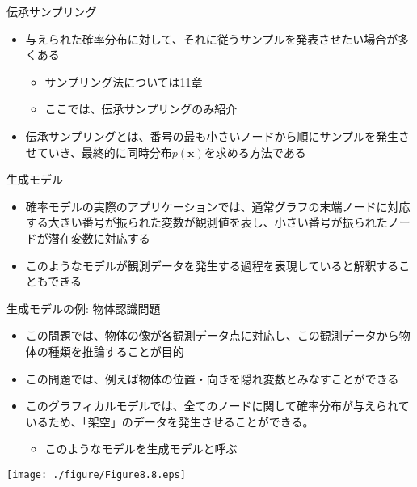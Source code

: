 \begin{frame}{伝承サンプリング}
 \begin{itemize}
  \item 与えられた確率分布に対して、それに従うサンプルを発表させたい場合が多くある
        \begin{itemize}
         \item サンプリング法については11章
         \item ここでは、伝承サンプリングのみ紹介
        \end{itemize}
  \item 伝承サンプリングとは、番号の最も小さいノードから順にサンプルを発生させていき、最終的に同時分布$p(\bm{x})$を求める方法である
 \end{itemize}
\end{frame}

\begin{frame}{生成モデル}
 \begin{itemize}
  \item 確率モデルの実際のアプリケーションでは、通常グラフの末端ノードに対応する大きい番号が振られた変数が観測値を表し、小さい番号が振られたノードが潜在変数に対応する
  \item このようなモデルが観測データを発生する過程を表現していると解釈することもできる
 \end{itemize}
\end{frame}

\begin{frame}{生成モデルの例: 物体認識問題}
 \begin{itemize}
  \item この問題では、物体の像が各観測データ点に対応し、この観測データから物体の種類を推論することが目的
  \item この問題では、例えば物体の位置・向きを隠れ変数とみなすことができる
  \item このグラフィカルモデルでは、全てのノードに関して確率分布が与えられているため、「架空」のデータを発生させることができる。
        \begin{itemize}
         \item このようなモデルを\alert{生成モデル}と呼ぶ
        \end{itemize}
 \end{itemize}
 \begin{center}
  \texttt{[image: ./figure/Figure8.8.eps]}
 \end{center}
\end{frame}
